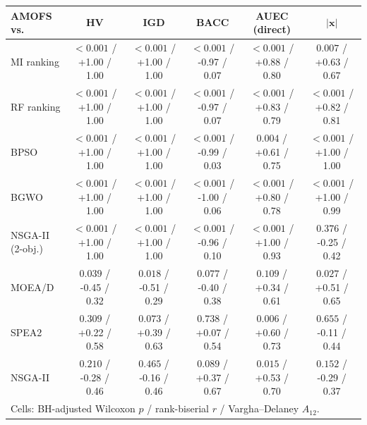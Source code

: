 \begin{tabular}{lccccc}
\toprule
AMOFS vs. & HV & IGD & BACC & AUEC (direct) & $|\mathbf{x}|$ \\
\midrule
MI ranking & $<\!0.001$ / +1.00 / 1.00 & $<\!0.001$ / +1.00 / 1.00 & $<\!0.001$ / -0.97 / 0.07 & $<\!0.001$ / +0.88 / 0.80 & $0.007$ / +0.63 / 0.67 \\
RF ranking & $<\!0.001$ / +1.00 / 1.00 & $<\!0.001$ / +1.00 / 1.00 & $<\!0.001$ / -0.97 / 0.07 & $<\!0.001$ / +0.83 / 0.79 & $<\!0.001$ / +0.82 / 0.81 \\
BPSO & $<\!0.001$ / +1.00 / 1.00 & $<\!0.001$ / +1.00 / 1.00 & $<\!0.001$ / -0.99 / 0.03 & $0.004$ / +0.61 / 0.75 & $<\!0.001$ / +1.00 / 1.00 \\
BGWO & $<\!0.001$ / +1.00 / 1.00 & $<\!0.001$ / +1.00 / 1.00 & $<\!0.001$ / -1.00 / 0.06 & $<\!0.001$ / +0.80 / 0.78 & $<\!0.001$ / +1.00 / 0.99 \\
NSGA-II (2-obj.) & $<\!0.001$ / +1.00 / 1.00 & $<\!0.001$ / +1.00 / 1.00 & $<\!0.001$ / -0.96 / 0.10 & $<\!0.001$ / +1.00 / 0.93 & $0.376$ / -0.25 / 0.42 \\
MOEA/D & $0.039$ / -0.45 / 0.32 & $0.018$ / -0.51 / 0.29 & $0.077$ / -0.40 / 0.38 & $0.109$ / +0.34 / 0.61 & $0.027$ / +0.51 / 0.65 \\
SPEA2 & $0.309$ / +0.22 / 0.58 & $0.073$ / +0.39 / 0.63 & $0.738$ / +0.07 / 0.54 & $0.006$ / +0.60 / 0.73 & $0.655$ / -0.11 / 0.44 \\
NSGA-II & $0.210$ / -0.28 / 0.46 & $0.465$ / -0.16 / 0.46 & $0.089$ / +0.37 / 0.67 & $0.015$ / +0.53 / 0.70 & $0.152$ / -0.29 / 0.37 \\
\bottomrule
\multicolumn{6}{l}{\footnotesize Cells: BH-adjusted Wilcoxon $p$ / rank-biserial $r$ / Vargha--Delaney $\hat A_{12}$.} \\
\end{tabular}
